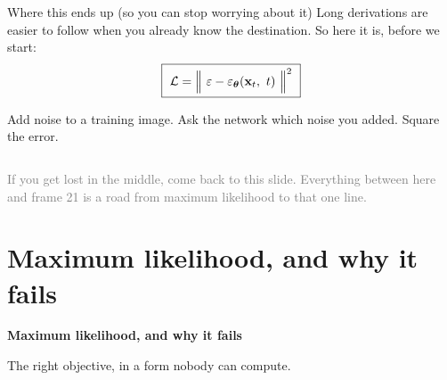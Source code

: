 \documentclass[aspectratio=169]{beamer}
\begin{document}
\begin{frame}{Where this ends up (so you can stop worrying about it)}
  \small
  Long derivations are easier to follow when you already know the destination. So here it
  is, before we start:
  \vskip 4pt
  \[
    \boxed{\ \mathcal{L} = \Big\|\ \varepsilon - \varepsilon_{\bm{\theta}}(\mathbf{x}_t,\ t)\ \Big\|^{2}\ }
  \]
  \vskip -2pt
  \begin{center}\footnotesize
    Add noise to a training image. Ask the network which noise you added. Square the error.
  \end{center}
  \vskip 6pt
  \begin{columns}[T]
  \end{columns}
  \vskip 5pt
  \footnotesize
  \textcolor{gray}{If you get lost in the middle, come back to this slide. Everything
  between here and frame 21 is a road from maximum likelihood to that one line.}
\end{frame}

\section{Maximum likelihood, and why it fails}

\begin{frame}[plain]
  \vfill
  \begin{center}
    {\Large\color{popblue}\textbf{Maximum likelihood, and why it fails}}\\[0.9em]
    \begin{minipage}{0.82\textwidth}\centering\small
      The right objective, in a form nobody can compute.
    \end{minipage}
  \end{center}
  \vfill
\end{frame}
\end{document}
